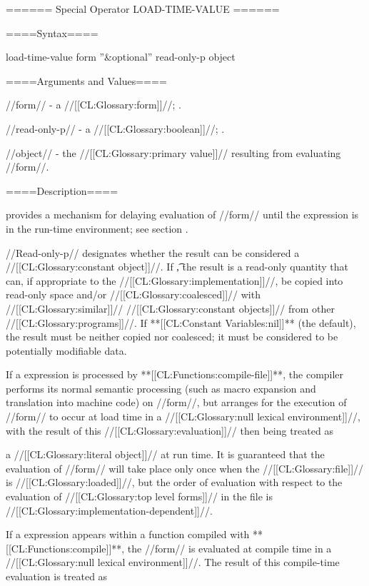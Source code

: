 ====== Special Operator LOAD-TIME-VALUE ======

====Syntax====

\DefspecWithValues load-time-value {form ''&optional'' read-only-p} {object}

====Arguments and Values====

//form// - a //[[CL:Glossary:form]]//; \evalspecial.

//read-only-p// - a //[[CL:Glossary:boolean]]//; \noeval.

//object// - the //[[CL:Glossary:primary value]]// resulting from evaluating //form//.

====Description====

 provides a mechanism for delaying evaluation of //form// until the expression is in the run-time environment; see section {\secref\Compilation}.

//Read-only-p// designates whether the result can be considered a //[[CL:Glossary:constant object]]//. If \t, the result is a read-only quantity that can, if appropriate to the //[[CL:Glossary:implementation]]//, be copied into read-only space and/or //[[CL:Glossary:coalesced]]// with //[[CL:Glossary:similar]]// //[[CL:Glossary:constant objects]]// from other //[[CL:Glossary:programs]]//. If **[[CL:Constant Variables:nil]]** (the default), the result must be neither copied nor coalesced; it must be considered to be potentially modifiable data.

If a  expression is processed by **[[CL:Functions:compile-file]]**, the compiler performs its normal semantic processing (such as macro expansion and translation into machine code) on //form//, but arranges for the execution of //form// to occur at load time in a //[[CL:Glossary:null lexical environment]]//, with the result of this //[[CL:Glossary:evaluation]]// then being treated as

a //[[CL:Glossary:literal object]]// at run time. It is guaranteed that the evaluation of //form// will take place only once when the //[[CL:Glossary:file]]// is //[[CL:Glossary:loaded]]//, but the order of evaluation with respect to the evaluation of //[[CL:Glossary:top level forms]]// in the file is //[[CL:Glossary:implementation-dependent]]//. 

If a  expression appears within a function compiled with **[[CL:Functions:compile]]**, the //form// is evaluated at compile time in a //[[CL:Glossary:null lexical environment]]//. The result of this compile-time evaluation is treated as

